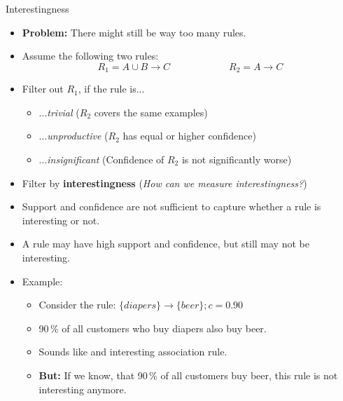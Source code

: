 
\begin{dwHeaderFrame}{Interestingness}
	\begin{itemize}
		\item \textbf{Problem:} There might still be way too many rules.
		\item Assume the following two rules:
		\begin{equation}
			R_1 =  A \cup B \rightarrow C \qquad\qquad\qquad R_2 = A \rightarrow C
		\end{equation}
		\item Filter out $R_1$, if the rule is...
		\begin{itemize}
			\item ...\textit{trivial} ($R_2$ covers the same examples)
			\item ...\textit{unproductive} ($R_2$ has equal or higher confidence)
			\item ...\textit{insignificant} (Confidence of $R_2$ is not significantly worse)
		\end{itemize}
		\item Filter by \textbf{interestingness} (\textit{How can we measure interestingness?})
	\end{itemize}
\end{dwHeaderFrame}


\begin{frame}
	\begin{itemize}
		\item Support and confidence are not sufficient to capture whether a rule is interesting or not.
		\item A rule may have high support and confidence, but still may not be interesting.
		\item Example:
		\begin{itemize}
			\item Consider the rule: $\{ diapers \} \rightarrow \{ beer \}; c = 0.90$
			\item 90\,\% of all customers who buy diapers also buy beer.
			\item Sounds like and interesting association rule.
			\item \textbf{But:} If we know, that 90\,\% of all customers buy beer, this rule is not interesting anymore.
		\end{itemize}
	\end{itemize}
\end{frame}



